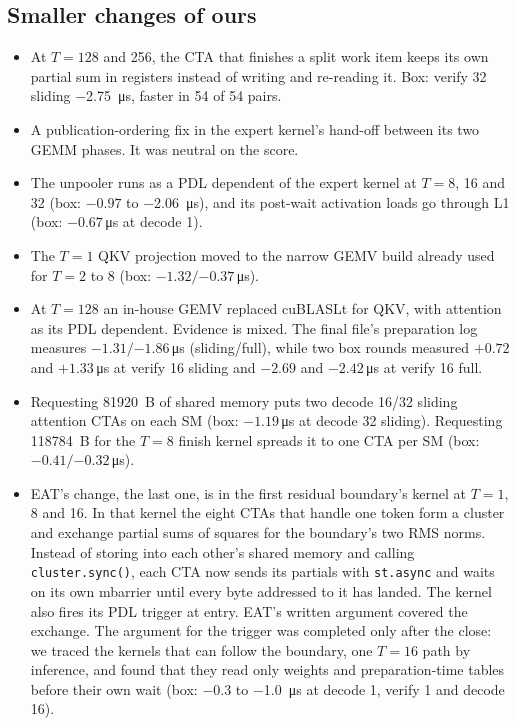 \documentclass[11pt]{article}
\begin{document}
\subsection{Smaller changes of ours}

\begin{itemize}
  \item At $T=128$ and 256, the CTA that finishes a split work item keeps its own
  partial sum in registers instead of writing and re-reading it. Box: verify 32
  sliding \SI{-2.75}{\micro\second}, faster in 54 of 54 pairs.
  \item A publication-ordering fix in the expert kernel's hand-off between its two
  GEMM phases. It was neutral on the score.
  \item The unpooler runs as a PDL dependent of the expert kernel at $T = 8$, 16
  and 32 (box: $-0.97$ to \SI{-2.06}{\micro\second}), and its post-wait activation
  loads go through L1 (box: $-0.67$\,\si{\micro\second} at decode 1).
  \item The $T=1$ QKV projection moved to the narrow GEMV build already used for
  $T=2$ to 8 (box: $-1.32/{-0.37}$\,\si{\micro\second}).
  \item At $T=128$ an in-house GEMV replaced cuBLASLt for QKV, with attention as
  its PDL dependent. Evidence is mixed. The final file's preparation log
  measures $-1.31/{-1.86}$\,\si{\micro\second} (sliding/full), while two box rounds
  measured $+0.72$ and $+1.33$\,\si{\micro\second} at verify 16 sliding and
  $-2.69$ and $-2.42$\,\si{\micro\second} at verify 16 full.
  \item Requesting \SI{81920}{B} of shared memory puts two decode 16/32
  sliding attention CTAs on each SM (box: $-1.19$\,\si{\micro\second} at decode 32
  sliding). Requesting \SI{118784}{B} for the $T=8$ finish kernel spreads it to
  one CTA per SM (box: $-0.41/{-0.32}$\,\si{\micro\second}).
  \item EAT's change, the last one, is in the first residual boundary's kernel at
  $T = 1$, 8 and 16. In that kernel the eight CTAs that handle one token form a
  cluster and exchange partial
  sums of squares for the boundary's two RMS norms. Instead of storing into each
  other's shared memory and calling \texttt{cluster.sync()}, each CTA now sends
  its partials with \texttt{st.async} and waits on its own mbarrier until every
  byte addressed to it has landed. The kernel also fires its PDL trigger at entry.
  EAT's written argument covered the exchange. The argument for the trigger was
  completed only after the close: we traced the kernels that can follow the
  boundary, one $T=16$ path by inference, and found that they read only weights
  and preparation-time tables before their own wait (box: $-0.3$ to
  \SI{-1.0}{\micro\second} at decode 1, verify 1 and decode 16).
\end{itemize}
\end{document}
